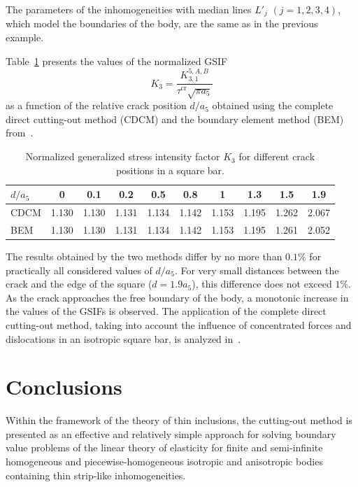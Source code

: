 The parameters of the inhomogeneities with median lines $L'_j$
$(j=1,2,3,4)$, which model the boundaries of the body,
are the same as in the previous example.

Table~\ref{VasilevTab2} presents the values of the normalized GSIF
\[
K_3=\frac{K_{3,1}^{5,A,B}}{\tau^{\mathrm{cr}}\sqrt{\pi a_5}}
\]
as a function of the relative crack position $d/a_5$ obtained using
the complete direct cutting-out method (CDCM) and the boundary
element method (BEM) from~\cite{Vasilev16}.

\begin{table}[!h]
	\centering
	\caption{Normalized generalized stress intensity factor $K_3$
		for different crack positions in a square bar.}
	\label{VasilevTab2}
	
	\begin{tabular*}{\textwidth}{@{\extracolsep{\fill}}lccccccccc}
		\toprule
		$d/a_5$ & 0 & 0.1 & 0.2 & 0.5 & 0.8 & 1 & 1.3 & 1.5 & 1.9 \\
		\midrule
		CDCM & 1.130 & 1.130 & 1.131 & 1.134 & 1.142 & 1.153 & 1.195 & 1.262 & 2.067 \\
		BEM  & 1.130 & 1.130 & 1.131 & 1.134 & 1.142 & 1.153 & 1.195 & 1.261 & 2.052 \\
		\bottomrule
	\end{tabular*}
	
\end{table}

The results obtained by the two methods differ by no more than
$0.1\%$ for practically all considered values of $d/a_5$.
For very small distances between the crack and the edge of the square
($d=1.9a_5$), this difference does not exceed $1\%$.
As the crack approaches the free boundary of the body, a monotonic
increase in the values of the GSIFs is observed.
The application of the complete direct cutting-out method, taking into
account the influence of concentrated forces and dislocations in an
isotropic square bar, is analyzed in~\cite{Vasilev16}.

\section{Conclusions}


Within the framework of the theory of thin inclusions, the cutting-out
method is presented as an effective and relatively simple approach for
solving boundary value problems of the linear theory of elasticity for
finite and semi-infinite homogeneous and piecewise-homogeneous isotropic
and anisotropic bodies containing thin strip-like inhomogeneities.

